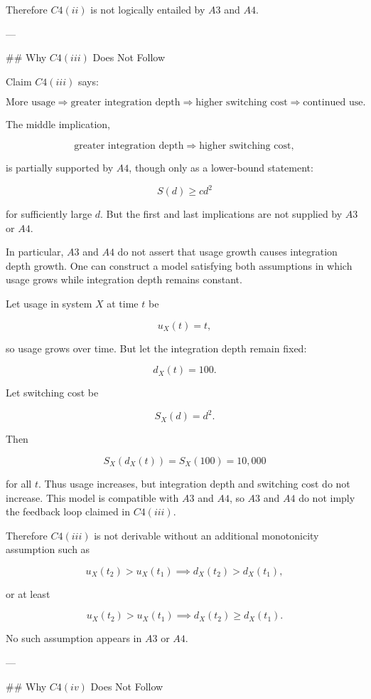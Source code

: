 Therefore \(C4(ii)\) is not logically entailed by \(A3\) and \(A4\).

---

## Why \(C4(iii)\) Does Not Follow

Claim \(C4(iii)\) says:

\[
\text{More usage} \Rightarrow \text{greater integration depth} \Rightarrow \text{higher switching cost} \Rightarrow \text{continued use}.
\]

The middle implication,

\[
\text{greater integration depth} \Rightarrow \text{higher switching cost},
\]

is partially supported by \(A4\), though only as a lower-bound statement:

\[
S(d) \ge c d^2
\]

for sufficiently large \(d\). But the first and last implications are not supplied by \(A3\) or \(A4\).

In particular, \(A3\) and \(A4\) do not assert that usage growth causes integration depth growth. One can construct a model satisfying both assumptions in which usage grows while integration depth remains constant.

Let usage in system \(X\) at time \(t\) be

\[
u_X(t)=t,
\]

so usage grows over time. But let the integration depth remain fixed:

\[
d_X(t)=100.
\]

Let switching cost be

\[
S_X(d)=d^2.
\]

Then

\[
S_X(d_X(t))=S_X(100)=10{,}000
\]

for all \(t\). Thus usage increases, but integration depth and switching cost do not increase. This model is compatible with \(A3\) and \(A4\), so \(A3\) and \(A4\) do not imply the feedback loop claimed in \(C4(iii)\).

Therefore \(C4(iii)\) is not derivable without an additional monotonicity assumption such as

\[
u_X(t_2)>u_X(t_1)
\implies
d_X(t_2)>d_X(t_1),
\]

or at least

\[
u_X(t_2)>u_X(t_1)
\implies
d_X(t_2)\ge d_X(t_1).
\]

No such assumption appears in \(A3\) or \(A4\).

---

## Why \(C4(iv)\) Does Not Follow

